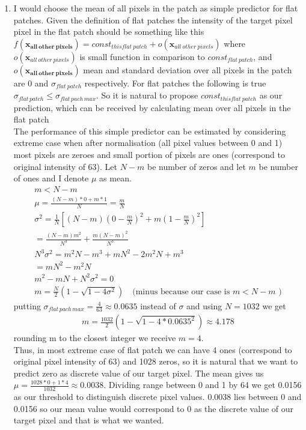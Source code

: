 \documentclass{article}
\newcommand{\vect}[1]{\boldsymbol{#1}} %
\begin{document}
\begin{enumerate}[label=(\alph*)]
				\item
					I would choose the mean of all pixels in the patch as simple predictor for flat patches. Given the definition of flat patches the intensity of the target pixel pixel in the flat patch should be something like this $f(\vect{x_{all\ other\ pixels}}) = const_{this flat\ patch} + o(\vect{x}_{all\ other\ pixels})$ where $o(\vect{x}_{all\ other\ pixels})$ is small function in comparison to $const_{flat\ patch}$, and $o(\vect{x_{all\ other\ pixels}})$  mean and standard deviation over all pixels in the patch are 0 and $\sigma_{flat\ patch}$ respectively. For flat patches the following is true $\sigma_{flat \, patch} \leq \sigma_{flat \, pach \, max}$. So it is natural to propose  $const_{this flat\ patch}$ as our prediction, which can be received by calculating mean over all pixels in the flat patch\\
					The performance of this simple predictor can be estimated by considering extreme case when after normalisation (all pixel values between 0 and 1) most pixels are zeroes and small portion of pixels are ones (correspond to original intensity of 63). Let $N-m$ be number of zeros and let $m$ be number of ones and I denote $\mu$ as mean. 
					\begin{gather*}
						m < N - m
						\\
						\mu = \frac{(N - m) * 0 + m * 1}{N} = \frac{m}{N}
						\\
						\sigma^2 =\frac{1}{N}[(N - m) (0 - \frac{m}{N})^2 + m(1 - \frac{m}{N})^2]
						\\
						= \frac{(N - m)m^2}{N^3} + \frac{m(N - m)^2}{N ^ 3}
						\\
						N^3\sigma^2 = m^2N - m^3 + mN^2 - 2m^2N + m^3 
						\\
						= mN^2-m^2N
						\\
						m^2 - mN + N^2\sigma^2 = 0
						\\
						m = \frac{N}{2}(1 - \sqrt{1 - 4 \sigma ^ 2})\quad\text{(minus because our case is $m < N - m$ )}
					\end{gather*}
					putting $\sigma_{flat \, pach \, max} = \frac{4}{63} \approx 0.0635$ instead of $\sigma$ and using $N = 1032$ we get
					\begin{gather*}
						m = \frac{1032}{2}(1 - \sqrt{1 - 4 * 0.0635^2}) \approx 4.178
					\end{gather*}
					rounding m to the closest integer we receive $m = 4$. \\Thus, in most extreme case of flat patch we can have 4 ones (correspond to original pixel intensity of 63) and 1028 zeros, so it is natural that we want to predict zero as discrete value of our target pixel.  The mean gives us $\mu = \frac{1028 * 0 + 1 * 4} {1032} \approx 0.0038$. Dividing range between 0 and 1 by 64 we get 0.0156 as our threshold to distinguish discrete pixel values. 0.0038 lies between 0 and 0.0156 so our mean value would correspond to 0 as the discrete value of our target pixel and that is what we wanted.

\end{enumerate}
\end{document}
